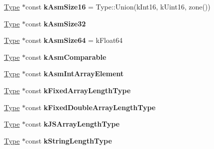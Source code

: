 \begin{DoxyCompactItemize}
\item 
\hyperlink{classv8_1_1internal_1_1_type}{Type} $\ast$const {\bfseries k\+Asm\+Size16} = Type\+::\+Union(k\+Int16, k\+Uint16, zone())\hypertarget{classv8_1_1internal_1_1_type_cache_a51cc98aec973233b2c66f7943918afab}{}\label{classv8_1_1internal_1_1_type_cache_a51cc98aec973233b2c66f7943918afab}

\item 
\hyperlink{classv8_1_1internal_1_1_type}{Type} $\ast$const {\bfseries k\+Asm\+Size32}
\item 
\hyperlink{classv8_1_1internal_1_1_type}{Type} $\ast$const {\bfseries k\+Asm\+Size64} = k\+Float64\hypertarget{classv8_1_1internal_1_1_type_cache_a217db193275d819e4f46faa8d8b171ea}{}\label{classv8_1_1internal_1_1_type_cache_a217db193275d819e4f46faa8d8b171ea}

\item 
\hyperlink{classv8_1_1internal_1_1_type}{Type} $\ast$const {\bfseries k\+Asm\+Comparable}
\item 
\hyperlink{classv8_1_1internal_1_1_type}{Type} $\ast$const {\bfseries k\+Asm\+Int\+Array\+Element}
\item 
\hyperlink{classv8_1_1internal_1_1_type}{Type} $\ast$const {\bfseries k\+Fixed\+Array\+Length\+Type}
\item 
\hyperlink{classv8_1_1internal_1_1_type}{Type} $\ast$const {\bfseries k\+Fixed\+Double\+Array\+Length\+Type}
\item 
\hyperlink{classv8_1_1internal_1_1_type}{Type} $\ast$const {\bfseries k\+J\+S\+Array\+Length\+Type}
\item 
\hyperlink{classv8_1_1internal_1_1_type}{Type} $\ast$const {\bfseries k\+String\+Length\+Type}
\end{DoxyCompactItemize}
